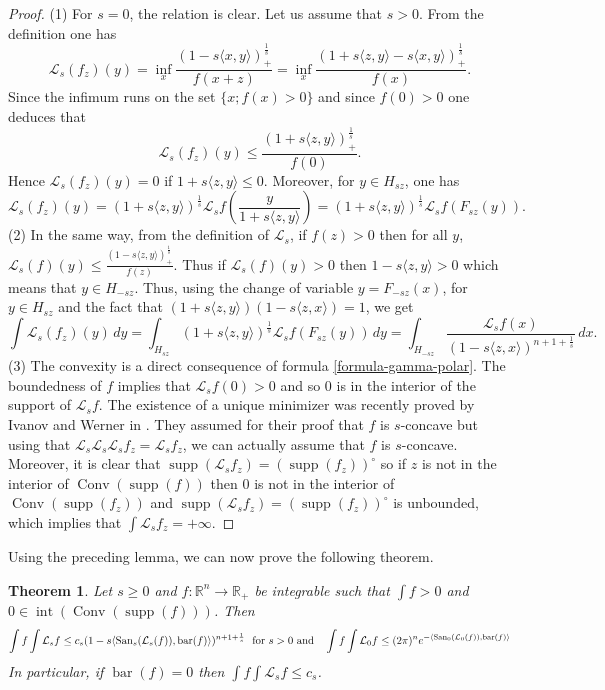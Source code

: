 \documentclass[10pt]{amsart}
\newtheorem{thm}{Theorem}[section]
\theoremstyle{definition}
\theoremstyle{remark}
\newcommand{\R}{\mathbb{R}}
\renewcommand{\L}{\mathcal{L}}
\newcommand{\conv}{\operatorname{Conv}}
\newcommand{\inte}{\operatorname{int}}
\newcommand{\supp}{\operatorname{supp}}
\newcommand{\bary}{\operatorname{bar}}
\newcommand{\san}{\operatorname{San}}
\begin{document}
\begin{proof}
(1) For $s=0$, the relation is clear. Let us assume that $s>0$. From the definition one has 
\[
\L_s(f_z)(y)=\inf_x\frac{(1-s\langle x,y\rangle)_+^\frac{1}{s}}{f(x+z)}=\inf_x\frac{(1+s\langle z,y\rangle-s\langle x,y\rangle)_+^\frac{1}{s}}{f(x)}.
\]
Since the infimum runs on the set $\{x; f(x)>0\}$ and since $f(0)>0$ one deduces that 
\[
\L_s(f_z)(y)\le \frac{(1+s\langle z,y\rangle)_+^\frac{1}{s}}{f(0)}.
\]
Hence $\L_s(f_z)(y)=0$ if $1+s\langle z,y\rangle\le0$. 
Moreover, for $y\in H_{s z}$, one has
\[
\L_s(f_z)(y)= (1+s\langle z,y\rangle)^\frac{1}{s}\L_s f\left(\frac{y}{1+s\langle z,y\rangle}\right)=(1+s\langle z,y\rangle)^\frac{1}{s}\L_s f(F_{s z}(y)).
\]
(2) In the same way, from the definition of $\L_s$, if $f(z)>0$ then for all $y$,  $\L_s(f)(y)\le\frac{(1-s\langle z,y\rangle)_+^\frac{1}{s}}{f(z)}$. Thus if $\L_s(f)(y)>0$ then $1-s\langle z,y\rangle>0$ which means that $y\in H_{-s z}$.
Thus, using the change of variable $y=F_{-s z}(x)$, for $y\in H_{s z}$ and the fact that $(1+s\langle z,y\rangle)(1-s\langle z,x\rangle)=1$, we get 
\[
\int\L_s(f_z)(y)\,dy=\int_{H_{s z}}(1+s\langle z,y\rangle)^\frac{1}{s}\L_s f(F_{s z}(y))\,dy=\int_{H_{-s z}}\frac{\L_s f(x)}{(1-s\langle z,x\rangle)^{n+1+\frac{1}{s}}}\,dx.
\]
(3) The convexity is a direct consequence of formula \eqref{formula-gamma-polar}. The boundedness of $f$ implies that $\L_s f(0)>0$ and so $0$ is in the interior of the support of $\L_s f$. The existence of a unique minimizer was recently proved by Ivanov and  Werner in \cite{iw22}. They assumed for their proof that $f$ is $s$-concave but using that $\L_s\L_s\L_s f_z=\L_s f_z$, we can actually assume that $f$ is $s$-concave.
Moreover, it is clear that $\supp(\L_s f_z)=(\supp(f_z))^\circ$ so if $z$ is not in the interior of $\conv(\supp(f))$ then $0$ is not in the interior of $\conv(\supp(f_z))$ and $\supp(\L_s f_z)=(\supp(f_z))^\circ$ is unbounded, which implies that $\int \L_s f_z=+\infty$.
\end{proof}

Using the preceding lemma, we can now prove the following theorem. 
\begin{thm}\label{BS-fun-gen}
Let $s\ge0$ and $f:\R^n\to\R_+$ be integrable such that $\int f>0$ and $0\in \inte(\conv(\supp(f)))$. Then 
\[
\int f\int \L_s f\le c_s (1-s\langle \san_s(\L_s(f)),\bary(f)\rangle)^{n+1+\frac{1}{s}} \ \  \hbox{for $s>0$ and }\ \ \int f\int \L_0 f\le (2\pi)^ne^{-\langle \san_0(\L_0(f)),\bary(f)\rangle}
\]
In particular, if $\bary(f)=0$ then $\int f\int \L_s f\le c_s$.
\end{thm}
\end{document}
